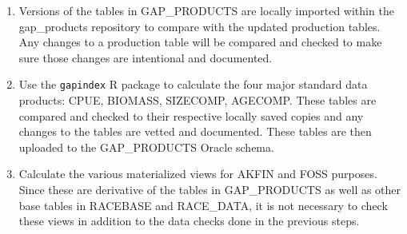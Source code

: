 \documentclass[
  letterpaper,
  oneside,
  open=any]{scrbook}
\begin{document}
\begin{enumerate}
\def\labelenumi{\arabic{enumi}.}
\item
  Versions of the tables in GAP\_PRODUCTS are locally imported within
  the gap\_products repository to compare with the updated production
  tables. Any changes to a production table will be compared and checked
  to make sure those changes are intentional and documented.
\item
  Use the \texttt{gapindex} R package to calculate the four major
  standard data products: CPUE, BIOMASS, SIZECOMP, AGECOMP. These tables
  are compared and checked to their respective locally saved copies and
  any changes to the tables are vetted and documented. These tables are
  then uploaded to the GAP\_PRODUCTS Oracle schema.
\item
  Calculate the various materialized views for AKFIN and FOSS purposes.
  Since these are derivative of the tables in GAP\_PRODUCTS as well as
  other base tables in RACEBASE and RACE\_DATA, it is not necessary to
  check these views in addition to the data checks done in the previous
  steps.
\end{enumerate}
\end{document}
